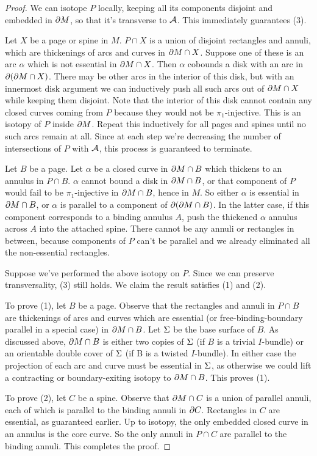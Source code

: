 \begin{proof}

We can isotope $P$ locally, keeping all its components disjoint and embedded in
$\partial M$, so that it's transverse to $\mathcal{A}$. This immediately guarantees (3).

Let $X$ be a page or spine in $M$. $P \cap X$ is a union of disjoint rectangles
and annuli, which are thickenings of arcs and curves in $\partial M \cap X$. Suppose
one of these is an arc $\alpha$ which is not essential in $\partial M \cap X$. Then
$\alpha$ cobounds a disk with an arc in $\partial (\partial M \cap X)$. There may be
other arcs in the interior of this disk, but with an innermost disk argument we
can inductively push all such arcs out of $\partial M \cap X$ while keeping them
disjoint.  Note that the interior of this disk cannot contain any closed curves
coming from $P$ because they would not be $\pi_1$-injective. This is an isotopy
of $P$ inside $\partial M$.  Repeat this inductively for all pages and spines until
no such arcs remain at all.  Since at each step we're decreasing the number of
intersections of $P$ with $\mathcal{A}$, this process is guaranteed to terminate.

Let $B$ be a page. Let $\alpha$ be a closed curve in $\partial M \cap B$ which
thickens to an annulus in $P \cap B$. $\alpha$ cannot bound a disk in $\partial
M \cap B$, or that component of $P$ would fail to be $\pi_1$-injective in $\partial
M \cap B$, hence in $M$. So either $\alpha$ is essential in $\partial M \cap B$, or
$\alpha$ is parallel to a component of $\partial(\partial M \cap B)$. In the latter case,
if this component corresponds to a binding annulus $A$, push the thickened
$\alpha$ annulus across $A$ into the attached spine.  There cannot be any
annuli or rectangles in between, because components of $P$ can't be parallel
and we already eliminated all the non-essential rectangles.

Suppose we've performed the above isotopy on $P$. Since we can preserve
transversality, (3) still holds. We claim the result satisfies (1) and (2).

To prove (1), let $B$ be a page. Observe that the rectangles and annuli in $P
\cap B$ are thickenings of arcs and curves which are essential (or
free-binding-boundary parallel in a special case) in $\partial M \cap B$. Let $\Sigma$
be the base surface of $B$. As discussed above, $\partial M \cap B$ is either two
copies of $\Sigma$ (if $B$ is a trivial $I$-bundle) or an orientable double cover
of $\Sigma$ (if B is a twisted $I$-bundle). In either case the projection of each
arc and curve must be essential in $\Sigma$, as otherwise we could lift
a contracting or boundary-exiting isotopy to $\partial M \cap B$. This proves (1).

To prove (2), let $C$ be a spine. Observe that $\partial M \cap C$ is a union of
parallel annuli, each of which is parallel to the binding annuli in $\partial C$.
Rectangles in $C$ are essential, as guaranteed earlier. Up to isotopy, the only
embedded closed curve in an annulus is the core curve. So the only annuli in $P
\cap C$ are parallel to the binding annuli. This completes the proof.

\end{proof}


